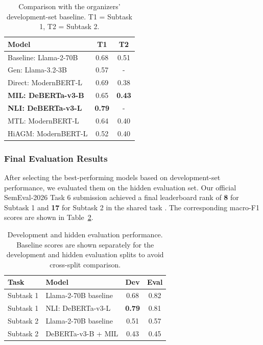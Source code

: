 \documentclass[11pt]{article}
\begin{document}
\begin{table}[h]
\centering
\small
\begin{tabular}{lcc}
\hline
\textbf{Model} & \textbf{T1} & \textbf{T2} \\
\hline
Baseline: Llama-2-70B & 0.68 & 0.51 \\
\hline
Gen: Llama-3.2-3B & 0.57 & - \\
Direct: ModernBERT-L & 0.69 & 0.38 \\
\textbf{MIL: DeBERTa-v3-B} & 0.65 & \textbf{0.43} \\
\textbf{NLI: DeBERTa-v3-L} & \textbf{0.79} & - \\
MTL: ModernBERT-L & 0.64 & 0.40 \\
HiAGM: ModernBERT-L & 0.52 & 0.40 \\
\hline
\end{tabular}
\caption{Comparison with the organizers' development-set baseline. T1 = Subtask 1, T2 = Subtask 2.}
\label{tab:results}
\end{table}


\subsubsection{Final Evaluation Results}
After selecting the best-performing models based on development-set performance, we evaluated them on the hidden evaluation set. Our official SemEval-2026 Task 6 submission achieved a final leaderboard rank of \textbf{8} for Subtask 1 and \textbf{17} for Subtask 2 in the shared task \citep{b10}. The corresponding macro-F1 scores are shown in Table~\ref{tab:final}.

\begin{table}[h]
\centering
\small
\begin{tabular}{llcc}
\hline
\textbf{Task} & \textbf{Model} & \textbf{Dev} & \textbf{Eval} \\
\hline
Subtask 1 & Llama-2-70B baseline & 0.68 & 0.82 \\
Subtask 1 & NLI: DeBERTa-v3-L & \textbf{0.79} & 0.81 \\
\hline
Subtask 2 & Llama-2-70B baseline & 0.51 & 0.57 \\
Subtask 2 & DeBERTa-v3-B + MIL & 0.43 & 0.45 \\
\hline
\end{tabular}
\caption{Development and hidden evaluation performance. Baseline scores are shown separately for the development and hidden evaluation splits to avoid cross-split comparison.}\label{tab:final}
\end{table}
\end{document}
